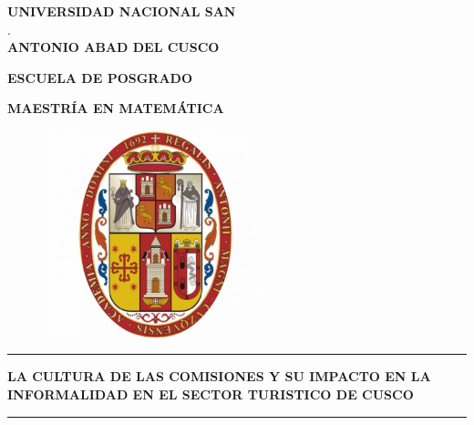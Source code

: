 \documentclass[12pt,a4]{article}
\author{Blake Toscani Apaza Pérez}
\begin{document}
\begin{titlepage}

\begin{center}

\vspace*{-1.1cm}


{\fontsize{25}{21}\bf \selectfont 	UNIVERSIDAD NACIONAL SAN}\\.\\

{\fontsize{25}{21}\bf \selectfont 	ANTONIO ABAD DEL CUSCO}
\vspace*{0.5cm}

{\fontsize{14}{17}\bf \selectfont ESCUELA DE POSGRADO\\ }

\vspace*{0.5cm}

{\fontsize{14}{17} \bf \selectfont MAESTRÍA EN  MATEMÁTICA}

\vspace*{0.5cm}

\begin{figure}[h]

\begin{center}

\includegraphics[width=6.5cm,height=6cm]{unsaac.jpg}

\end{center}

\end{figure}

\begin{Large}

\vspace*{-0.8cm}
\rule{162mm}{0.1mm}
\vspace*{0.4cm}

\textbf{\fontsize{14}{15} LA CULTURA DE LAS COMISIONES Y SU IMPACTO EN LA INFORMALIDAD EN EL SECTOR TURISTICO DE CUSCO} 

\rule{162mm}{0.1mm}


\end{Large}
\end{center}
\end{titlepage}
\end{document}
